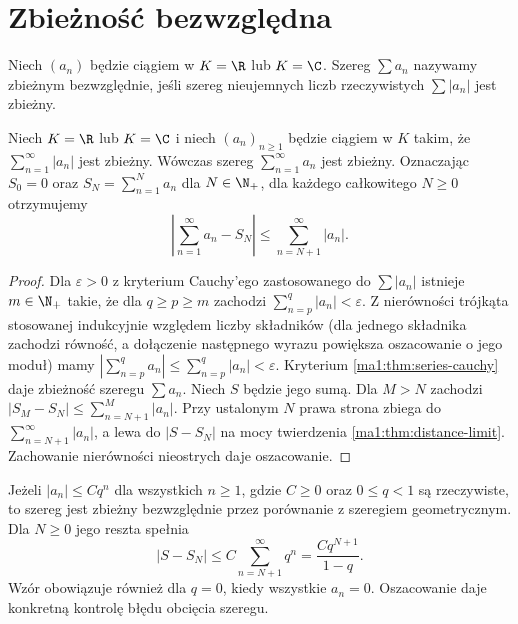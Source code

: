 \section{Zbieżność bezwzględna}
\begin{definicja}
\label{ma1:def:absolute-series}
Niech $(a_n)$ będzie ciągiem w $K=\R$ lub $K=\C$. Szereg $\sum a_n$ nazywamy zbieżnym bezwzględnie, jeśli szereg nieujemnych liczb rzeczywistych $\sum |a_n|$ jest zbieżny.
\end{definicja}
\begin{twierdzenie}
\label{ma1:thm:absolute-series}
Niech $K=\R$ lub $K=\C$ i niech $(a_n)_{n\ge1}$ będzie ciągiem w $K$ takim, że $\sum_{n=1}^\infty |a_n|$ jest zbieżny. Wówczas szereg $\sum_{n=1}^\infty a_n$ jest zbieżny. Oznaczając $S_0=0$ oraz $S_N=\sum_{n=1}^N a_n$ dla $N\in\N_+$, dla każdego całkowitego $N\ge0$ otrzymujemy
\[
 \left|\sum_{n=1}^\infty a_n-S_N\right|\le
 \sum_{n=N+1}^\infty|a_n|.
\]
\end{twierdzenie}
\begin{proof}
Dla $\varepsilon>0$ z kryterium Cauchy'ego zastosowanego do $\sum|a_n|$ istnieje $m\in\N_+$ takie, że dla $q\ge p\ge m$ zachodzi $\sum_{n=p}^q|a_n|<\varepsilon$. Z nierówności trójkąta stosowanej indukcyjnie względem liczby składników (dla jednego składnika zachodzi równość, a dołączenie następnego wyrazu powiększa oszacowanie o jego moduł) mamy
$|\sum_{n=p}^q a_n|\le\sum_{n=p}^q|a_n|<\varepsilon$.
Kryterium \ref{ma1:thm:series-cauchy} daje zbieżność szeregu $\sum a_n$. Niech $S$ będzie jego sumą. Dla $M>N$ zachodzi
$|S_M-S_N|\le\sum_{n=N+1}^M|a_n|$. Przy ustalonym $N$ prawa strona zbiega do $\sum_{n=N+1}^\infty|a_n|$, a lewa do $|S-S_N|$ na mocy twierdzenia \ref{ma1:thm:distance-limit}. Zachowanie nierówności nieostrych daje oszacowanie.
\end{proof}
\begin{przyklad}
Jeżeli $|a_n|\le Cq^n$ dla wszystkich $n\ge1$, gdzie $C\ge0$ oraz $0\le q<1$ są rzeczywiste, to szereg jest zbieżny bezwzględnie przez porównanie z szeregiem geometrycznym. Dla $N\ge0$ jego reszta spełnia
\[
 |S-S_N|\le C\sum_{n=N+1}^\infty q^n
 =\frac{Cq^{N+1}}{1-q}.
\]
Wzór obowiązuje również dla $q=0$, kiedy wszystkie $a_n=0$. Oszacowanie daje konkretną kontrolę błędu obcięcia szeregu.
\end{przyklad}

